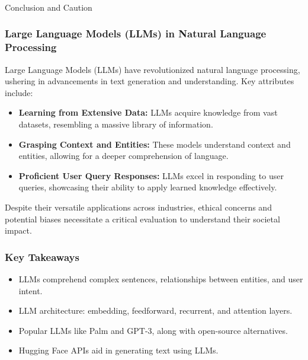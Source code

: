 \begin{frame}[fragile]\frametitle{}
\begin{center}
{\Large Conclusion and Caution}
\end{center}
\end{frame}


\begin{frame}[fragile]\frametitle{Large Language Models (LLMs) in Natural Language Processing}

  Large Language Models (LLMs) have revolutionized natural language processing, ushering in advancements in text generation and understanding. Key attributes include:

  \begin{itemize}
    \item \textbf{Learning from Extensive Data:} LLMs acquire knowledge from vast datasets, resembling a massive library of information.

    \item \textbf{Grasping Context and Entities:} These models understand context and entities, allowing for a deeper comprehension of language.

    \item \textbf{Proficient User Query Responses:} LLMs excel in responding to user queries, showcasing their ability to apply learned knowledge effectively.

  \end{itemize}

  Despite their versatile applications across industries, ethical concerns and potential biases necessitate a critical evaluation to understand their societal impact.

\end{frame}

\begin{frame}[fragile]\frametitle{Key Takeaways}

  \begin{itemize}
    \item LLMs comprehend complex sentences, relationships between entities, and user intent.
    \item LLM architecture: embedding, feedforward, recurrent, and attention layers.
    \item Popular LLMs like Palm and GPT-3, along with open-source alternatives.
    \item Hugging Face APIs aid in generating text using LLMs.
  \end{itemize}
\end{frame}

